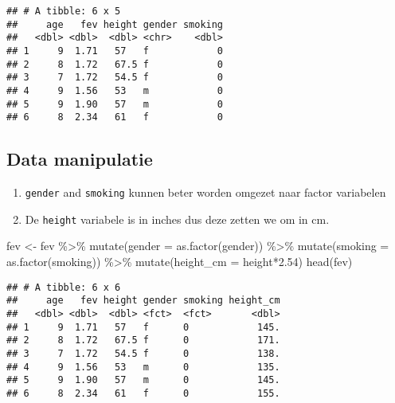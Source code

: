 \documentclass[
]{article}
\newenvironment{Shaded}{\begin{snugshade}}{\end{snugshade}}
\newcommand{\AttributeTok}[1]{\textcolor[rgb]{0.77,0.63,0.00}{#1}}
\newcommand{\FloatTok}[1]{\textcolor[rgb]{0.00,0.00,0.81}{#1}}
\newcommand{\FunctionTok}[1]{\textcolor[rgb]{0.00,0.00,0.00}{#1}}
\newcommand{\NormalTok}[1]{#1}
\newcommand{\OtherTok}[1]{\textcolor[rgb]{0.56,0.35,0.01}{#1}}
\newcommand{\SpecialCharTok}[1]{\textcolor[rgb]{0.00,0.00,0.00}{#1}}
\providecommand{\tightlist}{%
  \setlength{\itemsep}{0pt}\setlength{\parskip}{0pt}}
\begin{document}
\begin{verbatim}
## # A tibble: 6 x 5
##     age   fev height gender smoking
##   <dbl> <dbl>  <dbl> <chr>    <dbl>
## 1     9  1.71   57   f            0
## 2     8  1.72   67.5 f            0
## 3     7  1.72   54.5 f            0
## 4     9  1.56   53   m            0
## 5     9  1.90   57   m            0
## 6     8  2.34   61   f            0
\end{verbatim}

\hypertarget{data-manipulatie}{%
\subsection{Data manipulatie}\label{data-manipulatie}}

\begin{enumerate}
\def\labelenumi{\arabic{enumi}.}
\tightlist
\item
  \texttt{gender} and \texttt{smoking} kunnen beter worden omgezet naar
  factor variabelen
\item
  De \texttt{height} variabele is in inches dus deze zetten we om in cm.
\end{enumerate}

\begin{Shaded}
\begin{Highlighting}[]
\NormalTok{fev }\OtherTok{\textless{}{-}}\NormalTok{ fev }\SpecialCharTok{\%\textgreater{}\%}
  \FunctionTok{mutate}\NormalTok{(}\AttributeTok{gender =} \FunctionTok{as.factor}\NormalTok{(gender)) }\SpecialCharTok{\%\textgreater{}\%}
  \FunctionTok{mutate}\NormalTok{(}\AttributeTok{smoking =} \FunctionTok{as.factor}\NormalTok{(smoking)) }\SpecialCharTok{\%\textgreater{}\%}
  \FunctionTok{mutate}\NormalTok{(}\AttributeTok{height\_cm =}\NormalTok{ height}\SpecialCharTok{*}\FloatTok{2.54}\NormalTok{)}
\FunctionTok{head}\NormalTok{(fev)}
\end{Highlighting}
\end{Shaded}

\begin{verbatim}
## # A tibble: 6 x 6
##     age   fev height gender smoking height_cm
##   <dbl> <dbl>  <dbl> <fct>  <fct>       <dbl>
## 1     9  1.71   57   f      0            145.
## 2     8  1.72   67.5 f      0            171.
## 3     7  1.72   54.5 f      0            138.
## 4     9  1.56   53   m      0            135.
## 5     9  1.90   57   m      0            145.
## 6     8  2.34   61   f      0            155.
\end{verbatim}
\end{document}
